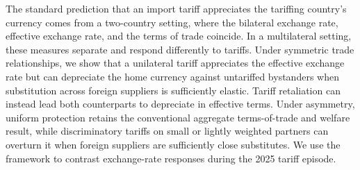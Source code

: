 The standard prediction that an import tariff appreciates the tariffing country's currency comes from a two-country setting, where the bilateral exchange rate, effective exchange rate, and the terms of trade coincide. In a multilateral setting, these measures separate and respond differently to tariffs. Under symmetric trade relationships, we show that a unilateral tariff appreciates the effective exchange rate but can depreciate the home currency against untariffed bystanders when substitution across foreign suppliers is sufficiently elastic. Tariff retaliation can instead lead both counterparts to depreciate in effective terms. Under asymmetry, uniform protection retains the conventional aggregate terms-of-trade and welfare result, while discriminatory tariffs on small or lightly weighted partners can overturn it when foreign suppliers are sufficiently close substitutes. We use the framework to contrast exchange-rate responses during the 2025 tariff episode.
